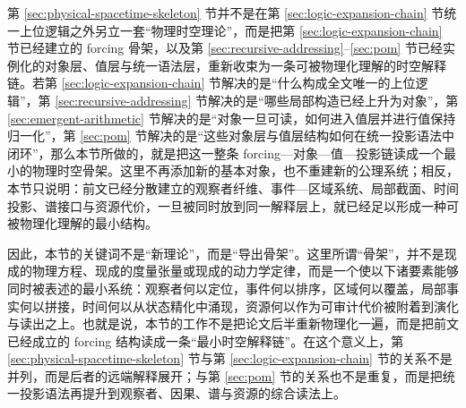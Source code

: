 第 \ref{sec:physical-spacetime-skeleton} 节并不是在第 \ref{sec:logic-expansion-chain} 节统一上位逻辑之外另立一套“物理时空理论”，而是把第 \ref{sec:logic-expansion-chain} 节已经建立的 forcing 骨架，以及第 \ref{sec:recursive-addressing}--\ref{sec:pom} 节已经实例化的对象层、值层与统一语法层，重新收束为一条可被物理化理解的时空解释链。若第 \ref{sec:logic-expansion-chain} 节解决的是“什么构成全文唯一的上位逻辑”，第 \ref{sec:recursive-addressing} 节解决的是“哪些局部构造已经上升为对象”，第 \ref{sec:emergent-arithmetic} 节解决的是“对象一旦可读，如何进入值层并进行值保持归一化”，第 \ref{sec:pom} 节解决的是“这些对象层与值层结构如何在统一投影语法中闭环”，那么本节所做的，就是把这一整条 forcing—对象—值—投影链读成一个最小的物理时空骨架。这里不再添加新的基本对象，也不重建新的公理系统；相反，本节只说明：前文已经分散建立的观察者纤维、事件—区域系统、局部截面、时间投影、谱接口与资源代价，一旦被同时放到同一解释层上，就已经足以形成一种可被物理化理解的最小结构。

因此，本节的关键词不是“新理论”，而是“导出骨架”。这里所谓“骨架”，并不是现成的物理方程、现成的度量张量或现成的动力学定律，而是一个使以下诸要素能够同时被表述的最小系统：观察者何以定位，事件何以排序，区域何以覆盖，局部事实何以拼接，时间何以从状态精化中涌现，资源何以作为可审计代价被附着到演化与读出之上。也就是说，本节的工作不是把论文后半重新物理化一遍，而是把前文已经成立的 forcing 结构读成一条“最小时空解释链”。在这个意义上，第 \ref{sec:physical-spacetime-skeleton} 节与第 \ref{sec:logic-expansion-chain} 节的关系不是并列，而是后者的远端解释展开；与第 \ref{sec:pom} 节的关系也不是重复，而是把统一投影语法再提升到观察者、因果、谱与资源的综合读法上。
